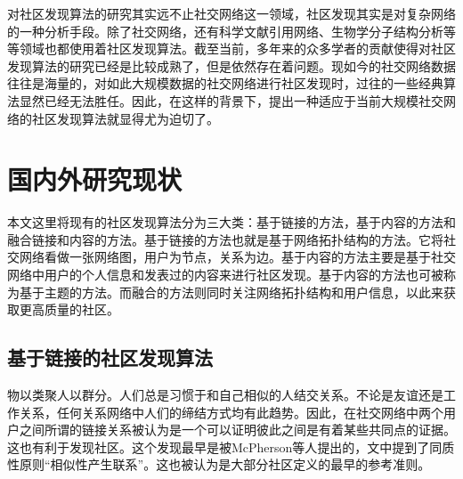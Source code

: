对社区发现算法的研究其实远不止社交网络这一领域，社区发现其实是对复杂网络的一种分析手段。除了社交网络，还有科学文献引用网络、生物学分子结构分析等等领域也都使用着社区发现算法。截至当前，多年来的众多学者的贡献使得对社区发现算法的研究已经是比较成熟了，但是依然存在着问题。现如今的社交网络数据往往是海量的，对如此大规模数据的社交网络进行社区发现时，过往的一些经典算法显然已经无法胜任。因此，在这样的背景下，提出一种适应于当前大规模社交网络的社区发现算法就显得尤为迫切了。

\section{国内外研究现状}

本文这里将现有的社区发现算法分为三大类：基于链接的方法，基于内容的方法和融合链接和内容的方法。基于链接的方法也就是基于网络拓扑结构的方法。它将社交网络看做一张网络图，用户为节点，关系为边。基于内容的方法主要是基于社交网络中用户的个人信息和发表过的内容来进行社区发现。基于内容的方法也可被称为基于主题的方法。而融合的方法则同时关注网络拓扑结构和用户信息，以此来获取更高质量的社区。

\subsection{基于链接的社区发现算法}

物以类聚人以群分。人们总是习惯于和自己相似的人结交关系。不论是友谊还是工作关系，任何关系网络中人们的缔结方式均有此趋势。因此，在社交网络中两个用户之间所谓的链接关系被认为是一个可以证明彼此之间是有着某些共同点的证据。这也有利于发现社区。这个发现最早是被McPherson等人\cite{Mcpherson2001Birds}提出的，文中提到了同质性原则“相似性产生联系”。这也被认为是大部分社区定义的最早的参考准则。

